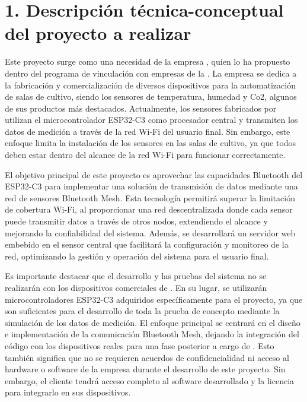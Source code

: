 \documentclass[
11pt, %
]{charter}
\begin{document}
\section{1. Descripción técnica-conceptual del proyecto a realizar}
\label{sec:descripcion}
Este proyecto surge como una necesidad de la empresa {\empclientename}, quien lo ha propuesto dentro del programa de vinculación con empresas de la {\degreename}. La empresa se dedica a la fabricación y comercialización de diversos dispositivos para la automatización de salas de cultivo, siendo los sensores de temperatura, humedad y Co2, algunos de sus productos más destacados. Actualmente, los sensores fabricados por {\empclientename} utilizan el microcontrolador ESP32-C3 como procesador central y transmiten los datos de medición a través de la red Wi-Fi del usuario final. Sin embargo, este enfoque limita la instalación de los sensores en las salas de cultivo, ya que todos deben estar dentro del alcance de la red Wi-Fi para funcionar correctamente.

El objetivo principal de este proyecto es aprovechar las capacidades Bluetooth del ESP32-C3 para implementar una solución de transmisión de datos mediante una red de sensores Bluetooth Mesh. Esta tecnología permitirá superar la limitación de cobertura Wi-Fi, al proporcionar una red descentralizada donde cada sensor puede transmitir datos a través de otros nodos, extendiendo el alcance y mejorando la confiabilidad del sistema. Además, se desarrollará un servidor web embebido en el sensor central que facilitará la configuración y monitoreo de la red, optimizando la gestión y operación del sistema para el usuario final.

Es importante destacar que el desarrollo y las pruebas del sistema no se realizarán con los dispositivos comerciales de {\empclientename}. En su lugar, se utilizarán microcontroladores ESP32-C3 adquiridos específicamente para el proyecto, ya que son suficientes para el desarrollo de toda la prueba de concepto mediante la simulación de los datos de medición. El enfoque principal se centrará en el diseño e implementación de la comunicación Bluetooth Mesh, dejando la integración del código con los dispositivos reales para una fase posterior a cargo de {\empclientename}. Esto también significa que no se requieren acuerdos de confidencialidad ni acceso al hardware o software de la empresa durante el desarrollo de este proyecto. Sin embargo, el cliente tendrá acceso completo al software desarrollado y la licencia para integrarlo en sus dispositivos.
\end{document}
